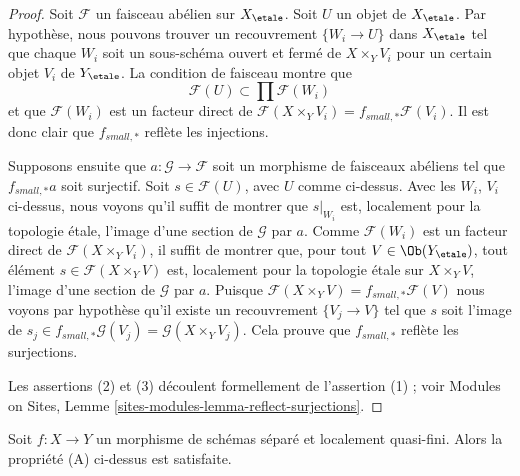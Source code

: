 \begin{proof}
Soit $\mathcal{F}$ un faisceau ab\'elien sur $X_\etale$.
Soit $U$ un objet de $X_\etale$. Par hypoth\`ese, nous pouvons trouver un
recouvrement $\{W_i \to U\}$ dans $X_\etale$ tel que chaque $W_i$ soit
un sous-sch\'ema ouvert et ferm\'e de $X \times_Y V_i$ pour un certain objet
$V_i$ de $Y_\etale$. La condition de faisceau montre que
$$
\mathcal{F}(U) \subset \prod \mathcal{F}(W_i)
$$
et que $\mathcal{F}(W_i)$ est un facteur direct de
$\mathcal{F}(X \times_Y V_i) = f_{small, *}\mathcal{F}(V_i)$.
Il est donc clair que $f_{small, *}$ refl\`ete les injections.

\medskip\noindent
Supposons ensuite que $a : \mathcal{G} \to \mathcal{F}$ soit un morphisme de
faisceaux ab\'eliens tel que $f_{small, *}a$ soit surjectif. Soit
$s \in \mathcal{F}(U)$, avec $U$ comme ci-dessus. Avec les $W_i$, $V_i$ ci-dessus,
nous voyons qu'il suffit de montrer que $s|_{W_i}$ est, localement pour la topologie \'etale,
l'image d'une section de $\mathcal{G}$ par $a$. Comme $\mathcal{F}(W_i)$
est un facteur direct de $\mathcal{F}(X \times_Y V_i)$,
il suffit de montrer que, pour tout $V \in \Ob(Y_\etale)$,
tout \'el\'ement $s \in \mathcal{F}(X \times_Y V)$
est, localement pour la topologie \'etale sur $X \times_Y V$, l'image d'une section de
$\mathcal{G}$ par $a$. Puisque
$\mathcal{F}(X \times_Y V) = f_{small, *}\mathcal{F}(V)$
nous voyons par hypoth\`ese qu'il existe un recouvrement $\{V_j \to V\}$ tel que
$s$ soit l'image de
$s_j \in f_{small, *}\mathcal{G}(V_j) = \mathcal{G}(X \times_Y V_j)$.
Cela prouve que $f_{small, *}$ refl\`ete les surjections.

\medskip\noindent
Les assertions (2) et (3) d\'ecoulent formellement de l'assertion (1) ; voir
Modules on Sites, Lemme \ref{sites-modules-lemma-reflect-surjections}.
\end{proof}

\begin{lemma}
\label{lemma-locally-quasi-finite-A}
Soit $f : X \to Y$ un morphisme de sch\'emas s\'epar\'e et localement quasi-fini.
Alors la propri\'et\'e (A) ci-dessus est satisfaite.
\end{lemma}

